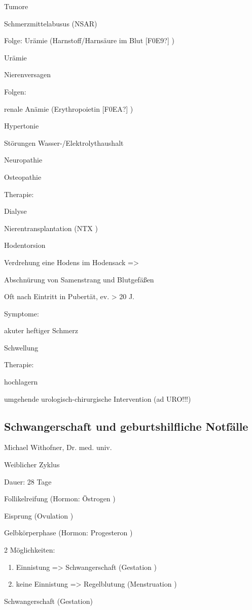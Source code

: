 \documentclass{article}
\begin{document}
Tumore

Schmerzmittelabusus (NSAR)

Folge: Ur\"amie (Harnstoff/Harns\"aure im  Blut [F0E9?] )

Ur\"amie

Nierenversagen

Folgen:

renale An\"amie  (Erythropoietin  [F0EA?] )

Hypertonie

St\"orungen Wasser-/Elektrolythaushalt

Neuropathie

Osteopathie

Therapie:

Dialyse

Nierentransplantation (NTX )

Hodentorsion

Verdrehung eine Hodens im Hodensack  ={\textgreater}

Abschn\"urung von Samenstrang und  Blutgef\"a{\ss}en

Oft nach Eintritt in Pubert\"at, ev. {\textgreater} 20 J.

Symptome:

akuter heftiger Schmerz

Schwellung

Therapie:

hochlagern

umgehende urologisch-chirurgische  Intervention (ad URO!!!)

\subsection{Schwangerschaft und geburtshilfliche Notf\"alle}
Michael Withofner, Dr. med. univ.

Weiblicher Zyklus

Dauer: 28 Tage

Follikelreifung (Hormon: \"Ostrogen )

Eisprung (Ovulation )

Gelbk\"orperphase (Hormon: Progesteron )

2 M\"oglichkeiten:

\begin{enumerate}
\item Einnistung ={\textgreater} Schwangerschaft (Gestation )

\item keine Einnistung ={\textgreater} Regelblutung  (Menstruation )

\end{enumerate}
Schwangerschaft (Gestation)
\end{document}
